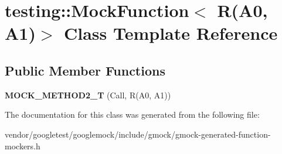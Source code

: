 \hypertarget{classtesting_1_1MockFunction_3_01R_07A0_00_01A1_08_4}{}\section{testing\+:\+:Mock\+Function$<$ R(A0, A1)$>$ Class Template Reference}
\label{classtesting_1_1MockFunction_3_01R_07A0_00_01A1_08_4}
\subsection*{Public Member Functions}
\begin{DoxyCompactItemize}
\item 
{\bfseries M\+O\+C\+K\+\_\+\+M\+E\+T\+H\+O\+D2\+\_\+T} (Call, R(A0, A1))\hypertarget{classtesting_1_1MockFunction_3_01R_07A0_00_01A1_08_4_a5a4d673a3252cab866f0a4fa97486190}{}\label{classtesting_1_1MockFunction_3_01R_07A0_00_01A1_08_4_a5a4d673a3252cab866f0a4fa97486190}

\end{DoxyCompactItemize}


The documentation for this class was generated from the following file\+:\begin{DoxyCompactItemize}
\item 
vendor/googletest/googlemock/include/gmock/gmock-\/generated-\/function-\/mockers.\+h\end{DoxyCompactItemize}
